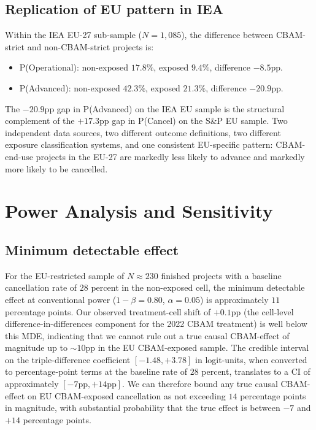 \documentclass[11pt,a4paper]{article}
\begin{document}
\subsection{Replication of EU pattern in IEA}

Within the IEA EU-27 sub-sample ($N = 1{,}085$), the difference between CBAM-strict and non-CBAM-strict projects is:

\begin{itemize}
\item P(Operational): non-exposed $17.8\%$, exposed $9.4\%$, difference $-8.5$pp.
\item P(Advanced):    non-exposed $42.3\%$, exposed $21.3\%$, difference $-20.9$pp.
\end{itemize}

The $-20.9$pp gap in P(Advanced) on the IEA EU sample is the structural complement of the $+17.3$pp gap in P(Cancel) on the S\&P EU sample. Two independent data sources, two different outcome definitions, two different exposure classification systems, and one consistent EU-specific pattern: CBAM-end-use projects in the EU-27 are markedly less likely to advance and markedly more likely to be cancelled.

\section{Power Analysis and Sensitivity}
\label{sec:ch8-power}

\subsection{Minimum detectable effect}

For the EU-restricted sample of $N \approx 230$ finished projects with a baseline cancellation rate of $28$ percent in the non-exposed cell, the minimum detectable effect at conventional power ($1 - \beta = 0.80$, $\alpha = 0.05$) is approximately $11$ percentage points. Our observed treatment-cell shift of $+0.1$pp (the cell-level difference-in-differences component for the 2022 CBAM treatment) is well below this MDE, indicating that we cannot rule out a true causal CBAM-effect of magnitude up to $\sim 10$pp in the EU CBAM-exposed sample. The credible interval on the triple-difference coefficient $[-1.48, +3.78]$ in logit-units, when converted to percentage-point terms at the baseline rate of $28$ percent, translates to a CI of approximately $[-7\text{pp}, +14\text{pp}]$. We can therefore bound any true causal CBAM-effect on EU CBAM-exposed cancellation as not exceeding $14$ percentage points in magnitude, with substantial probability that the true effect is between $-7$ and $+14$ percentage points.
\end{document}
